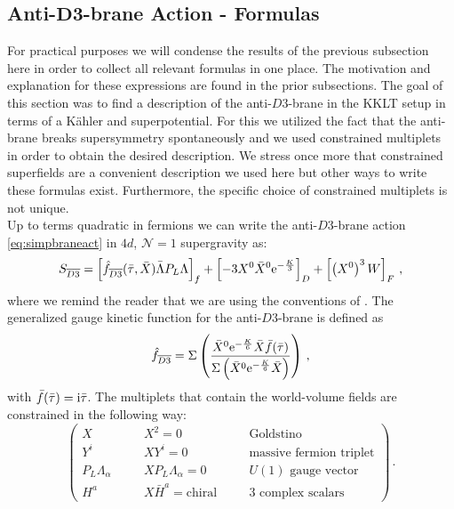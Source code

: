 \documentclass[a4paper,12pt]{report}
\newcommand{\be}{\begin{equation}}
\newcommand{\ee}{\end{equation}}
\def\rmi{{\rm i}}
\def\rme{{\rm e}}
\begin{document}
\subsection[Anti-$D3$-brane Action - Formulas]{Anti-$\mathbf{D3}$-brane Action - Formulas}
For practical purposes we will condense the results of the previous subsection here in order to collect all relevant formulas in one place. The motivation and explanation for these expressions are found in the prior subsections. The goal of this section was to find a description of the anti-$D3$-brane in the KKLT setup in terms of a Kähler and superpotential. For this we utilized the fact that the anti-brane breaks supersymmetry spontaneously and we used constrained multiplets in order to obtain the desired description. We stress once more that constrained superfields are a convenient description we used here but other ways to write these formulas exist. Furthermore, the specific choice of constrained multiplets is not unique.\\
Up to terms quadratic in fermions we can write the anti-$D3$-brane action \eqref{eq:simpbraneact} in $4d$, $\mathcal{N}=1$ supergravity as:
\be 
S_{\overline{D3}}=\left[\hat{f}_{\overline{D3}}(\bar{\tau},\bar{X}) \bar{\Lambda}P_L\Lambda\right]_f + \left[-3X^0 \bar{X}^0\rme^{-\frac{K}{3}}\right]_D + \left[\left(X^0\right)^3 W\right]_F\,,
\label{eq:D3barfinalact}
\ee
where we remind the reader that we are using the conventions of \cite{Freedman:2012zz}. The generalized gauge kinetic function for the anti-$D3$-brane is defined as
\be 
\hat{f}_{\overline{D3}} = \Sigma\left( \frac{\bar{X}^0 \rme^{-\frac{K}{6}}\bar{X}\bar{f}(\bar{\tau})}{\Sigma \left( \bar{X}^0 \rme^{-\frac{K}{6}}\bar{X}\right)}\right)\,,
\ee
with $\bar{f}(\bar{\tau}) = \rmi \bar{\tau}$. The multiplets that contain the world-volume fields are constrained in the following way:
\be
\begin{pmatrix}
X & \quad & X^2=0 & \quad & \text{Goldstino}\\
Y^i & & X Y^i = 0& & \text{massive fermion triplet}\\
P_L \Lambda_\alpha & & X P_L \Lambda_\alpha = 0 & & U(1) \text{ gauge vector}\\
H^a & & X\bar{H}^a = \text{chiral} & & \text{3 complex scalars}
\end{pmatrix}\,.
\label{eq:D3barmultfinal}
\ee
\end{document}
